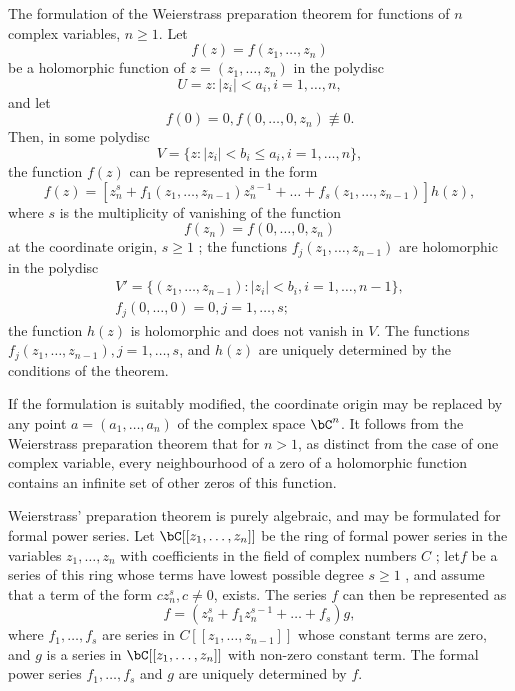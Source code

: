 \documentclass[lang=cn,12pt,fontset=none,a4paper]{beautybook}
\begin{document}
The formulation of the Weierstrass preparation theorem for functions of $n$ complex variables, $n\geq 1$. Let
$$
f(z)=f(z_1,\dots,z_n)
$$
be a holomorphic function of $z=(z_1,\dots,z_n)$ in the polydisc
$$
U={z:|z_i|<a_i,i=1,\dots,n},
$$
and let
$$
f(0)=0,  f(0,\dots,0,z_n)\not\equiv 0.
$$
Then, in some polydisc
$$
V=\{z:|z_i|<b_i\leq a_i, i=1,\dots,n\},
$$
the function $f(z)$ can be represented in the form
$$
f(z)= [z^s_n+f_1(z_1,\dots,z_{n-1})z^{s-1}_n+\dots
+f_s(z_1,\dots,z_{n-1})]h(z),
$$
where $s$ is the multiplicity of vanishing of the function
$$
f(z_n)=f(0,\dots,0,z_n)
$$
at the coordinate origin, $s\geq 1$ ; the functions $f_j(z_1,\dots,z_{n-1})$ are holomorphic in the polydisc
$$
\begin{gathered}
   V'=\{(z_1,\dots,z_{n-1}):|z_i|<b_i,i=1,\dots,n-1\},\\
f_j(0,\dots,0)=0, j=1,\dots,s;
\end{gathered}
$$
the function $h(z)$ is holomorphic and does not vanish in $V$. The functions $f_j(z_1,\dots,z_{n-1}), j=1,\dots,s$, and $h(z)$ are uniquely determined by the conditions of the theorem.

If the formulation is suitably modified, the coordinate origin may be replaced by any point $a=(a_1,\dots,a_n)$ of the complex space $\bC^n$. It follows from the Weierstrass preparation theorem that for $n>1$, as distinct from the case of one complex variable, every neighbourhood of a zero of a holomorphic function contains an infinite set of other zeros of this function.

Weierstrass' preparation theorem is purely algebraic, and may be formulated for formal power series. Let $\bC[[z_1,\dots,z_n]]$ be the ring of formal power series in the variables $z_1,\dots,z_n$ with coefficients in the field of complex numbers $C$
; let$ f$ be a series of this ring whose terms have lowest possible degree $s\geq 1$
, and assume that a term of the form $c z^s_n, c≠0$, exists. The series $f$ can then be represented as
$$
f=(z^s_n+f_1 z^{s-1}_n+\dots+f_s)g,
$$
where $f_1,\dots,f_s$ are series in $C[[z_1,\dots,z_{n-1}]]$ whose constant terms are zero, and $g$ is a series in $\bC[[z_1,\dots,z_n]]$ with non-zero constant term. The formal power series $f_1,\dots,f_s$ and $g$ are uniquely determined by $f$.
\end{document}
